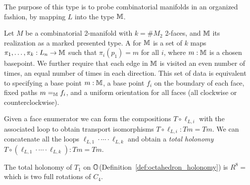 The purpose of this type is to probe combinatorial manifolds in an organized fashion, by mapping \( L \) into the type \( \mathbb{M} \).

\begin{mydef}
\label{def:face_enumerator}
Let \( M \) be a combinatorial 2-manifold with \( k=\#M_2 \) 2-faces, and \( \mathbb{M} \) its realization as a marked presented type. A  for \( \mathbb{M} \) is a set of \( k \) maps \( \pi_1,\ldots,\pi_k:L_n\to \mathbb{M} \) such that \( \pi_i(p_1)=m \) for all \( i \), where \( m:\mathbb{M} \) is a chosen basepoint. We further require that each edge in \( \mathbb{M} \) is visited an even number of times, an equal number of times in each direction. This set of data is equivalent to specifying a base point \( m:\mathbb{M} \), a base point \( f_i \) on the boundary of each face, fixed paths \( m=_{\mathbb{M}} f_i \), and a uniform orientation for all faces (all clockwise or counterclockwise). 
\end{mydef}

Given a face enumerator we can form the compositions \( T\circ\ell_{L,i} \) with the associated loop to obtain transport isomorphisms \( T\circ\ell_{L,i}:Tm=Tm \). We can concatenate all the loops \( \ell_{L,1}\cdot\cdots\cdot\ell_{L,k} \) and obtain a \emph{total holonomy} \( T\circ(\ell_{L,1}\cdot\cdots\cdot\ell_{L,k}):Tm=Tm  \).

\begin{mylemma}
The total holonomy of \( T_1 \) on \( \mathbb{O} \)(Definition~\ref{def:octahedron_holonomy}) is \( R^8=\) which is two full rotations of \( C_4 \).
\end{mylemma}

